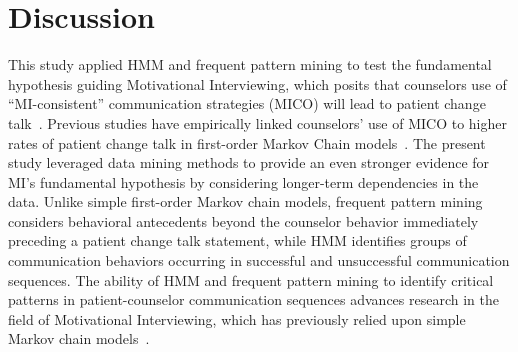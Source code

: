 \documentclass[smallextended]{svjour3}       %
\begin{document}
\section{Discussion}
\label{sec:discussion}
This study applied HMM and frequent pattern mining to test the fundamental hypothesis guiding Motivational Interviewing, which posits that counselors use of ``MI-consistent'' communication strategies (MICO) will lead to patient change talk~\cite{miller2009toward}. Previous studies have empirically linked counselors' use of MICO to higher rates of patient change talk in first-order Markov Chain models~\cite{moyers2006therapist, moyers2009session, gaume2010counselor}. The present study leveraged data mining methods to provide an even stronger evidence for MI's fundamental hypothesis by considering longer-term dependencies in the data. Unlike simple first-order Markov chain models, frequent pattern mining considers behavioral antecedents beyond the counselor behavior immediately preceding a patient change talk statement, while HMM identifies groups of communication behaviors occurring in successful and unsuccessful communication sequences. The ability of HMM and frequent pattern mining to identify critical patterns in patient-counselor communication sequences advances research in the field of Motivational Interviewing, which has previously relied upon simple Markov chain models~\cite{moyers2006therapist, moyers2009session, gaume2008counsellor, gaume2010counselor, glynn2014change, carcone2013provider, jacques2016building}.
\end{document}
